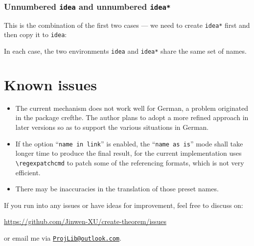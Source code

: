 \documentclass[classical]{einfart}
\newcommand{\packageoption}[1]{\texttt{\textcolor{black!67!green}{#1}}}
\newcommand{\commandoption}[1]{\texttt{\textcolor{black!67!cyan}{#1}}}
\begin{document}
\subsubsection{Unnumbered \texttt{idea} and unnumbered \texttt{idea*}}

This is the combination of the first two cases --- we need to create \texttt{idea*} first and then copy it to \texttt{idea}:

\begin{code}
\CreateTheorem{idea}{(*\commandoption{create starred version}*)}
\CreateTheorem{idea}{(*\commandoption{copy existed}*) = idea*}
\end{code}

\smallskip
In each case, the two environments \texttt{idea} and \texttt{idea*} share the same set of names.


\section{Known issues}

\begin{itemize}
    \item The current mechanism does not work well for German, a problem originated in the package \textsf{crefthe}. The author plans to adopt a more refined approach in later versions so as to support the various situations in German.
    \item If the option ``\packageoption{name in link}'' is enabled, the ``\packageoption{name as is}'' mode shall take longer time to produce the final result, for the current implementation uses \lstinline|\regexpatchcmd| to patch some of the referencing formats, which is not very efficient.
    \item There may be inaccuracies in the translation of those preset names.
\end{itemize}

If you run into any issues or have ideas for improvement, feel free to discuss on:
\begin{center}
    \url{https://github.com/Jinwen-XU/create-theorem/issues}
\end{center}
or email me via \href{mailto:ProjLib@outlook.com}{\texttt{ProjLib@outlook.com}}.
\end{document}
